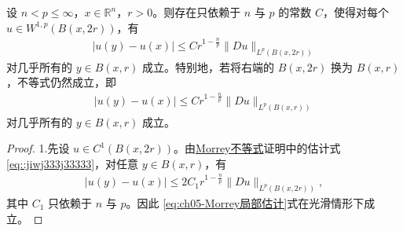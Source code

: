 \documentclass[../../main.tex]{subfiles}
\begin{document}
\begin{corollary}\label{corollary:ch05-Morrey局部估计}
设 $n<p\leqslant\infty$，$x\in\mathbb{R}^n$，$r>0$。则存在只依赖于 $n$ 与 $p$ 的常数 $C$，使得对每个 $u\in W^{1,p}(B(x,2r))$，有
\begin{align}\label{eq:ch05-Morrey局部估计}
|u(y)-u(x)|\leqslant C r^{1-\frac{n}{p}}\|Du\|_{L^p(B(x,2r))}
\end{align}
对几乎所有的 $y\in B(x,r)$ 成立。特别地，若将右端的 $B(x,2r)$ 换为 $B(x,r)$，不等式仍然成立，即
\begin{align}\label{eq:ch05-Morrey局部估计-球内}
|u(y)-u(x)|\leqslant C r^{1-\frac{n}{p}}\|Du\|_{L^p(B(x,r))}
\end{align}
对几乎所有的 $y\in B(x,r)$ 成立。
\end{corollary}
\begin{proof}

1.先设 $u\in C^1(B(x,2r))$。由\hyperref[theorem:Morrey不等式]{Morrey不等式}证明中的估计式\eqref{eq::jiwj333j33333}，对任意 $y\in B(x,r)$，有
\begin{align*}
|u(y)-u(x)|\leqslant 2C_1 r^{1-\frac{n}{p}}\|Du\|_{L^p(B(x,2r))},
\end{align*}
其中 $C_1$ 只依赖于 $n$ 与 $p$。因此 \eqref{eq:ch05-Morrey局部估计}式在光滑情形下成立。


\end{proof}
\end{document}
